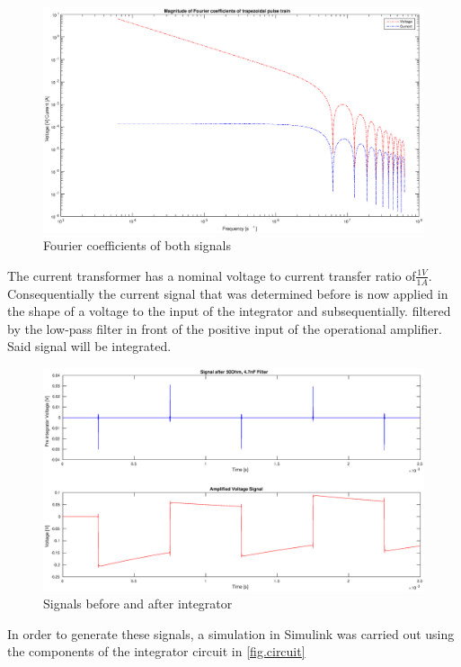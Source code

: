 \begin{figure}[h!tb]
\centerline{\includegraphics[width=\textwidth]{figures/Method/signal_simulation/fourierla.eps}}
\caption{Fourier coefficients of both signals}
\label{fig.fourierla}
\end{figure}

The current transformer has a nominal voltage to current transfer ratio of$\frac{1V}{1A}$. 
Consequentially the current signal that was determined before is now applied in the shape of a voltage to the input of the integrator and subsequentially.
filtered by the low-pass filter in front of the positive input of the operational amplifier. Said signal will be integrated.


\begin{figure}[h!tb]
\centerline{\includegraphics[width=\textwidth]{figures/Method/signal_simulation/integrated.eps}}
\caption{Signals before and after integrator}
\label{fig.integrator}
\end{figure}

In order to generate these signals, a simulation in Simulink was carried out using the components of the integrator circuit in \ref{fig.circuit}


